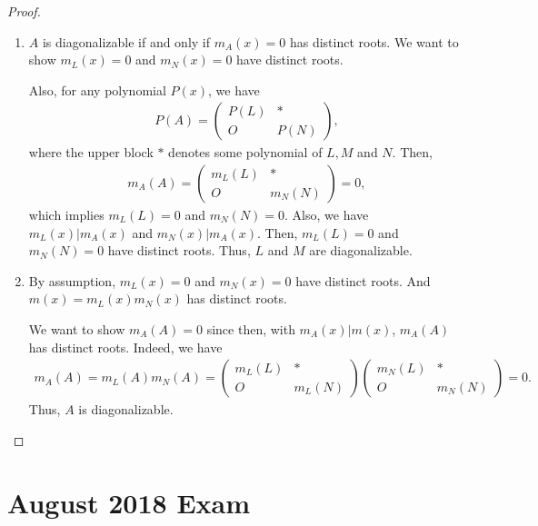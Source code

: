 \documentclass[11pt]{article}
\theoremstyle{definition}
\numberwithin{equation}{subsection}
\begin{document}
\begin{proof}
~\begin{enumerate}[label=(\alph*)]
    \item $A$ is diagonalizable if and only if $m_A(x) = 0$ has distinct roots. We want to show $m_L(x) = 0$ and $m_N(x) = 0$ have distinct roots.
    
    Also, for any polynomial $P(x)$, we have
    \begin{align*}
        P(A) = \begin{pmatrix}
            P(L) & * \\
            O    & P(N)
        \end{pmatrix},
    \end{align*}
    where the upper block $*$ denotes some polynomial of $L, M$ and $N$. Then, 
    \begin{align*}
        m_A(A) = \begin{pmatrix}
            m_L(L) & * \\
            O    & m_N(N)
        \end{pmatrix} = 0,
    \end{align*}
    which implies $m_L(L) = 0$ and $m_N(N) = 0$\cite{6}. Also, we have $m_L(x)|m_A(x)$ and $m_N(x)|m_A(x)$. Then, $m_L(L) = 0$ and $m_N(N) = 0$ have distinct roots. Thus, $L$ and $M$ are diagonalizable.
    
    \item By assumption, $m_L(x) = 0$ and $m_N(x) = 0$ have distinct roots. And $m(x) = m_L(x) m_N(x)$ has distinct roots. 
    
    We want to show $m_A(A) = 0$ since then, with $m_A(x)|m(x)$, $m_A(A)$ has distinct roots. Indeed, we have
    \begin{align*}
        m_A(A) = m_L(A)m_N(A) = \begin{pmatrix}
            m_L(L) & * \\
            O      & m_L(N)
        \end{pmatrix}
        \begin{pmatrix}
            m_N(L) & * \\
            O      & m_N(N)
        \end{pmatrix} = 0.
    \end{align*}
    Thus, $A$ is diagonalizable.
\end{enumerate}
\end{proof}

\newpage

\section{August 2018 Exam}
\end{document}
